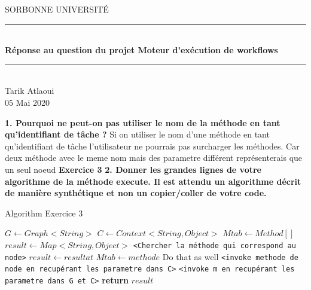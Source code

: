 \documentclass{article}
\date{\today}
\author{Tarik Atlaoui}
\begin{document}
\makeatletter
\def\BState{\State\hskip-\ALG@thistlm}
\makeatother

\begin{titlepage}
	\enlargethispage{2cm}
	\newcommand{\HRule}{\rule{\linewidth}{0.5mm}}
	\center
	\textsc{\LARGE
	SORBONNE UNIVERSITÉ 
	} \\[1cm]
	\HRule \\[0.4cm]
	{ \huge \bfseries Réponse au question du projet Moteur d’exécution de workflows \\[0.15cm] }
	\HRule \\[4cm]
	\large{Tarik Atlaoui} \\[3cm]
	05 Mai 2020 \\[3cm]

\end{titlepage}
                                                                                                                         
\textbf{1. Pourquoi ne peut-on pas utiliser le nom de la méthode en tant qu’identifiant de tâche ?}
\newline
\newline
   Si on utiliser le nom d'une méthode en tant qu'identifiant de tâche l'utilisateur ne pourrais pas surcharger les méthodes.
   Car deux méthode avec le meme nom mais des parametre différent représenterais que un seul noeud
\newline
\newline
\textbf{Exercice 3}
\newline
\textbf{2. Donner les grandes lignes de votre algorithme de la méthode execute. Il est attendu un
algorithme décrit de manière synthétique et non un copier/coller de votre code.}

\begin{algorithm}
  \caption{Algorithm Exercice 3}\label{euclid}
  \begin{algorithmic}[1]
      \State $G\gets Graph<String>$
      \State $C\gets Context<String , Object>$
      \State $Mtab\gets Method[]$
      \State $result\gets Map<String , Object>$
        \State \texttt{<Chercher la méthode qui correspond au node>}      
          \State $result\gets resultat$
          \State $Mtab\gets methode$
        \State Do that as well
        \Else
        \EndIf
        \State \texttt{<invoke methode de node en recupérant les parametre dans C>}
        \EndFor
        \State \texttt{<invoke m en recupérant les parametre dans G et C>}
      \EndFor
      \State \textbf{return} $result$
    \EndProcedure
  \end{algorithmic}
\end{algorithm}
\end{document}
